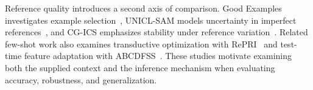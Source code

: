 Reference quality introduces a second axis of comparison. Good Examples investigates example selection~\cite{goodexamples}, UNICL-SAM models uncertainty in imperfect references~\cite{unicl}, and CG-ICS emphasizes stability under reference variation~\cite{cgics}. Related few-shot work also examines transductive optimization with RePRI~\cite{repri} and test-time feature adaptation with ABCDFSS~\cite{abcdfss}. These studies motivate examining both the supplied context and the inference mechanism when evaluating accuracy, robustness, and generalization.
